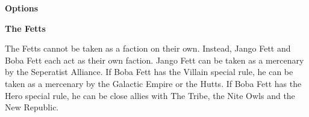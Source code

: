 \documentclass{article}
\begin{document}
{\large \textbf{Options}}
\vspace{0.3cm}
\begin{multicols}{2}
    {\scriptsize

    \setlength\extrarowheight{1.5pt}
    

    \vspace{0.6cm}
    
    \setlength\extrarowheight{1.5pt}
    

    \vspace{0.6cm}

    \setlength\extrarowheight{1.5pt}
    

    \vspace{0.6cm}

    \setlength\extrarowheight{1.5pt}
    
    
    }
\end{multicols}

\newpage

{\Large \textbf{The Fetts}}
\vspace{0.3cm}

\begin{minipage}{19cm}
    The Fetts cannot be taken as a faction on their own. Instead, Jango Fett and
    Boba Fett each act as their own faction.
    Jango Fett can be taken as a mercenary by the Seperatist Alliance.
    If Boba Fett has the Villain special rule, he can be taken as a mercenary by the 
    Galactic Empire or the Hutts.
    If Boba Fett has the Hero special rule, he can be close allies with The Tribe,
    the Nite Owls and the New Republic.
\end{minipage}

\vspace{0.3cm}
{\scriptsize
\setlength\extrarowheight{1.5pt}

}
\vspace{0.6cm}
\end{document}
